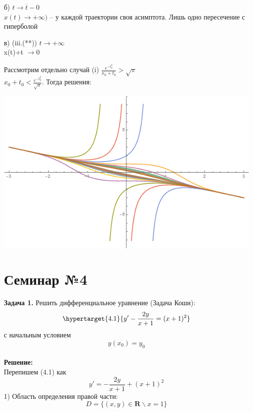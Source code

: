 \documentclass[10pt]{report}
\begin{document}
б) $ t \rightarrow \overline t-0$\\
$x(t) \rightarrow +\infty)$ -- у каждой траектории своя асимптота. Лишь одно пересечение с гиперболой

в) (iii.(**)) $t \rightarrow +\infty$\\
x(t)+t $ \rightarrow 0$

Рассмотрим отдельно случай (i) $\frac {e^{-t_0^2}}{x_0+t_0}> \sqrt{\pi}$\\
$ x_0+t_0 < \frac {e^{-t_0^2}}{\sqrt{\pi}}$. Тогда решения:
\begin{center}
{\includegraphics[scale=0.7]{graph3.5.png}} 
\end{center}

\chapter[{Семинар №4}]{Семинар №4}
\thispagestyle{empty}
\textbf{Задача 1.} Решить дифференциальное уравнение (Задача Коши): 
\newline
\begin{equation}
\hypertarget{4.1} {y' -  \frac {2y} {x+1} = (x+1)^2}
\end{equation}
\newline
с начальным условием
\newline
\begin{equation}
y(x_0) = y_0
\end{equation}\\

\textbf {Решение:}\\
Перепишем (4.1) как
 \[y' = - \frac {2y} {x+1} + (x+1)^2\]
1) Область определения правой части:
\[ D = \{(x,y) \in \textbf{R} \backslash x = 1\}\]
\end{document}
